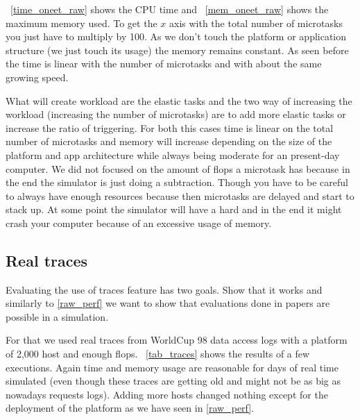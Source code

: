 \documentclass[a4paper, onecolumn, 11pt]{article}
\begin{document}
    \figurename~\ref{time_oneet_raw} shows the CPU time and
    \figurename~\ref{mem_oneet_raw} shows the maximum memory used. To get the
    $x$ axis with the total number of microtasks you just have to multiply by
    100. As we don't touch the platform or application structure (we just touch
    its usage) the memory remains constant. As seen before the time is linear 
    with the number of microtasks and with about the same growing speed.
    
    What will create workload are the elastic tasks and the two way of 
    increasing the workload (increasing the number of microtasks) are to add 
    more elastic tasks or increase the ratio of triggering. For both this cases 
    time is linear on the total number of microtasks and memory will increase 
    depending on the size of the platform and app architecture while always 
    being moderate for an present-day computer. We did not focused on the 
    amount of flops a microtask has because in the end the simulator is just 
    doing a subtraction. Though you have to be careful to always have enough 
    resources because then microtasks are delayed and start to stack up. At 
    some point the simulator will have a hard and in the end it might crash 
    your computer because of an excessive usage of memory.
    
    
       
  \subsection{Real traces} \label{real_traces}
		Evaluating the use of traces feature has two goals. Show that it works and 
		similarly to \ref{raw_perf} we want to show that evaluations done in papers 
		are possible in a simulation.
  
    For that we used real traces from WorldCup 98 data access logs \cite{wc98}
    with a platform of 2,000 host and enough flops. \figurename~\ref{tab_traces}
    shows the results of a few executions. Again time and memory usage are
    reasonable for days of real time simulated (even though these traces are
    getting old and might not be as big as nowadays requests logs). Adding more
    hosts changed nothing except for the deployment of the platform as we have
    seen in \ref{raw_perf}.
\end{document}
